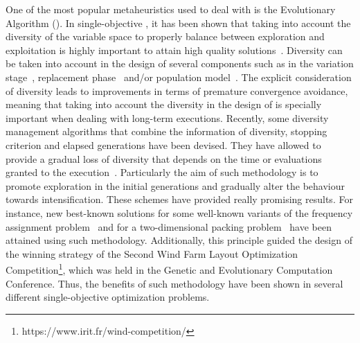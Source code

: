 One of the most popular metaheuristics used to deal with \MOPS{} is the Evolutionary Algorithm (\EA{}).
%
In single-objective \EAS{}, it has been shown that taking into account the diversity of the variable space
to properly balance between exploration and exploitation is highly important to attain high quality 
solutions~\cite{Joel:BALANCE_DIVERSITY}.
%
Diversity can be taken into account in the design of several components such as in the variation 
stage~\cite{Joel:FUZZY_ADAPTIVE_GA,Joel:CROSSOVER_DIVERSITY}, replacement phase~\cite{Joel:MULTI_DYNAMIC} 
and/or population model~\cite{Joel:SAWTOOTH}.
%
%
The explicit consideration of diversity leads to improvements in terms of premature convergence avoidance, 
meaning that taking into account the diversity in the design of \EAS{} is specially important when dealing 
with long-term executions.
%
Recently, some diversity management algorithms that combine the information of diversity, stopping criterion and elapsed 
generations have been devised.
%
They have allowed to provide a gradual loss of diversity that depends on the time or evaluations granted to the 
execution~\cite{Joel:MULTI_DYNAMIC}.
%
Particularly the aim of such methodology is to promote exploration in the initial generations and gradually alter the 
behaviour towards intensification.
%
These schemes have provided really promising results.
%
For instance, new best-known solutions for some well-known variants of the frequency assignment problem~\cite{Segura:17} 
and for a two-dimensional packing problem~\cite{Joel:MULTI_DYNAMIC} have been attained using such methodology.
%
Additionally, this principle guided the design of the winning strategy of the Second Wind Farm Layout Optimization 
Competition\footnote{https://www.irit.fr/wind-competition/}, which was held in the Genetic and Evolutionary 
Computation Conference.
%
Thus, the benefits of such methodology have been shown in several different single-objective optimization problems.

